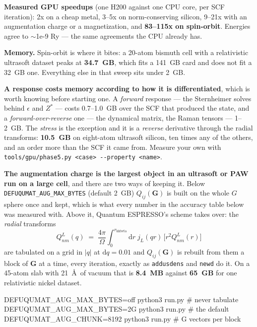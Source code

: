 \documentclass[11pt,a4paper]{article}
\newcommand{\qe}{Quantum ESPRESSO}
\newcommand{\code}[1]{\texttt{\small #1}}
\begin{document}
\textbf{Measured GPU speedups} (one H200 against one CPU core, per SCF
iteration): 2x on a cheap metal, 3--5x on norm-conserving silicon, 9--21x with
an augmentation charge or a magnetization, and \textbf{83--115x on spin-orbit}.
Energies agree to $\sim$1e-9 Ry --- the same agreements the CPU already has.

\textbf{Memory.} Spin-orbit is where it bites: a 20-atom bismuth cell with a
relativistic ultrasoft dataset peaks at \textbf{34.7~GB}, which fits a 141~GB
card and does not fit a 32~GB one. Everything else in that sweep sits under
2~GB.

\textbf{A response costs memory according to how it is differentiated}, which is
worth knowing before starting one. A \emph{forward} response --- the Sternheimer
solves behind $\epsilon$ and $Z^*$ --- costs 0.7--1.0~GB over the SCF that
produced the state, and a \emph{forward-over-reverse} one --- the dynamical
matrix, the Raman tensors --- 1--2~GB. The \emph{stress} is the exception and it
is a \emph{reverse} derivative through the radial transforms: \textbf{10.5~GB}
on eight-atom ultrasoft silicon, ten times any of the others, and an order more
than the SCF it came from. Measure your own with
\code{tools/gpu/phase5.py <case> -{}-property <name>}.

\textbf{The augmentation charge is the largest object in an ultrasoft or PAW
run on a large cell}, and there are two ways of keeping it. Below
\code{DEFUQUMAT\_AUG\_MAX\_BYTES} (default 2~GB) $Q_{ij}(\mathbf{G})$ is built on
the whole $G$ sphere once and kept, which is what every number in the accuracy
table below was measured with. Above it, \qe's scheme takes over: the
\emph{radial} transforms
%
\begin{equation*}
  Q^L_{nm}(q) \;=\; \frac{4\pi}{\Omega}\int_0^{r_{\mathrm{kkbeta}}}\!\!
  \mathrm{d}r\; j_L(qr)\,\bigl[r^2 Q^L_{nm}(r)\bigr]
\end{equation*}
%
are tabulated on a grid in $|q|$ at $\mathrm{d}q = 0.01$ and
$Q_{ij}(\mathbf{G})$ is rebuilt from them a block of $\mathbf{G}$ at a time,
every iteration, exactly as \code{addusdens} and \code{newd} do it. On a
45-atom slab with 21~\AA\ of vacuum that is \textbf{8.4~MB} against
\textbf{65~GB} for one relativistic nickel dataset.

\begin{shcode}
DEFUQUMAT_AUG_MAX_BYTES=off python3 run.py   # never tabulate
DEFUQUMAT_AUG_MAX_BYTES=2G  python3 run.py   # the default
DEFUQUMAT_AUG_CHUNK=8192    python3 run.py   # G vectors per block
\end{shcode}
\end{document}

